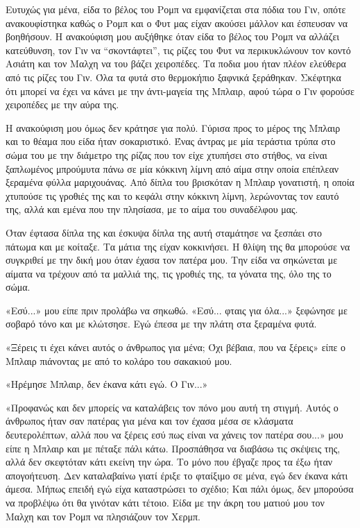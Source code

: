 \documentclass[12pt,twoside, openany]{book}
\begin{document}
Ευτυχώς για μένα, είδα το βέλος του Ρομπ να εμφανίζεται στα πόδια του Γιν, οπότε ανακουφίστηκα καθώς ο Ρομπ και ο Φυτ μας είχαν ακούσει μάλλον και έσπευσαν να βοηθήσουν. Η ανακούφιση μου αυξήθηκε όταν είδα το βέλος του Ρομπ να αλλάζει κατεύθυνση, τον Γιν να “σκοντάφτει”, τις ρίζες του Φυτ να περικυκλώνουν τον κοντό Ασιάτη και τον Μαλχη να του βάζει χειροπέδες. Τα ποδια μου ήταν πλέον ελεύθερα από τις ρίζες του Γιν. Όλα τα φυτά στο θερμοκήπιο ξαφνικά ξεράθηκαν. Σκέφτηκα ότι μπορεί να έχει να κάνει με την άντι-μαγεία της Μπλαιρ, αφού τώρα ο Γιν φορούσε χειροπέδες με την αύρα της.

Η ανακούφιση μου όμως δεν κράτησε για πολύ. Γύρισα προς το μέρος της Μπλαιρ και το θέαμα που είδα ήταν σοκαριστικό. Ένας άντρας με μία τεράστια τρύπα στο σώμα του με την διάμετρο της ρίζας που τον είχε χτυπήσει στο στήθος, να είναι ξαπλωμένος μπρούμυτα πάνω σε μία κόκκινη λίμνη από αίμα στην οποία επέπλεαν ξεραμένα φύλλα μαριχουάνας. Από δίπλα του βρισκόταν η Μπλαιρ γονατιστή, η οποία χτυπούσε τις γροθιές της και το κεφάλι στην κόκκινη λίμνη, λερώνοντας τον εαυτό της, αλλά και εμένα που την πλησίασα, με το αίμα του συναδέλφου μας. 

Όταν έφτασα δίπλα της και έσκυψα δίπλα της αυτή σταμάτησε να ξεσπάει στο πάτωμα και με κοίταξε. Τα μάτια της είχαν κοκκινήσει. Η θλίψη της θα μπορούσε να συγκριθεί με την δική μου όταν έχασα τον πατέρα μου. Την είδα να σηκώνεται με αίματα να τρέχουν από τα μαλλιά της, τις γροθιές της, τα γόνατα της, όλο της το σώμα.

«Εσύ...» μου είπε πριν προλάβω να σηκωθώ. «Εσύ... φταις για όλα...» ξεφώνησε με σοβαρό τόνο και με κλώτσησε. Εγώ έπεσα με την πλάτη στα ξεραμένα φυτά.

«Ξέρεις τι έχει κάνει αυτός ο άνθρωπος για μένα; Όχι βέβαια, που να ξέρεις» είπε ο Μπλαιρ πιάνοντας με από το κολάρο του σακακιού μου.

«Ηρέμησε Μπλαιρ, δεν έκανα κάτι εγώ. Ο Γιν...»

«Προφανώς και δεν μπορείς να καταλάβεις τον πόνο μου αυτή τη στιγμή. Αυτός ο άνθρωπος ήταν σαν πατέρας για μένα και τον έχασα μέσα σε κλάσματα δευτερολέπτων, αλλά που να ξέρεις εσύ πως είναι να χάνεις τον πατέρα σου...» μου είπε η Μπλαιρ και με πέταξε πάλι κάτω. Προσπάθησα να διαβάσω τις σκέψεις της, αλλά δεν σκεφτόταν κάτι εκείνη την ώρα. Το μόνο που έβγαζε προς τα έξω ήταν απογοήτευση. Δεν καταλαβαίνω γιατί έριξε το φταίξιμο σε μένα, εγώ δεν έκανα κάτι άμεσα. Μήπως επειδή εγώ είχα καταστρώσει το σχέδιο; Και πάλι όμως, δεν μπορούσα να προβλέψω ότι θα γινόταν κάτι τέτοιο. Είδα με την άκρη του ματιού μου τον Μαλχη και τον Ρομπ να πλησιάζουν τον Χερμπ.
\end{document}
